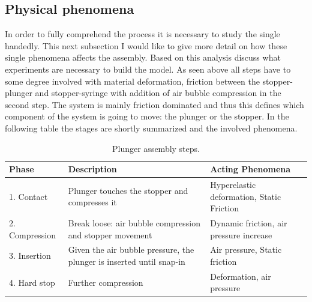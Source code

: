 \newpage
\subsection{Physical phenomena}
In order to fully comprehend the process it is necessary to study the single handedly. This next subsection I would like to give more detail on how these single phenomena affects the assembly.
Based on this analysis discuss what experiments are necessary to build the model. 
As seen above all steps have to some degree involved with material deformation, friction between the stopper-plunger and stopper-syringe with addition of air bubble compression in the second step.
The system is mainly friction dominated and thus this defines which component of the system is going to move: the plunger or the stopper.
In the following table the stages are shortly summarized and the involved phenomena.

\begin{table}[h]
\def\arraystretch{1.5}
\caption{Plunger assembly steps.}
	\begin{tabular}{l p{6cm}p{5cm}}
	Phase & Description & Acting Phenomena \\
    \hline
    1. Contact      & Plunger touches the stopper and compresses it & Hyperelastic deformation, Static Friction \\
    2. Compression  & Break loose: air bubble compression and stopper movement   & Dynamic friction, air pressure increase\\
    3. Insertion    & Given the air bubble pressure, the plunger is inserted until snap-in                         & Air pressure, Static friction\\
    4. Hard stop    & Further compression                           & Deformation, air pressure\\
    \hline
	\end{tabular}
\end{table}

